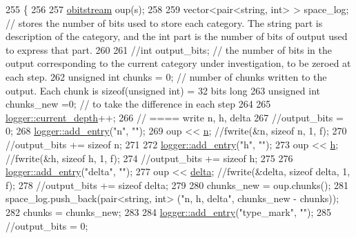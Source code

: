\begin{DoxyCode}
255                                                   \{
256   
257   \hyperlink{classobitstream}{obitstream} oup(s);
258 
259   vector<pair<string, int> > space\_log; \textcolor{comment}{// stores the number of bits used to store each category. The
       string part is description of the category, and the int part is the number of bits of output used to express that
       part.}
260 
261   \textcolor{comment}{//int output\_bits; // the number of bits in the output corresponding to the current category under
       investigation, to be zeroed at each step.}
262   \textcolor{keywordtype}{unsigned} \textcolor{keywordtype}{int} chunks = 0; \textcolor{comment}{// number of chunks written to the output. Each chunk is sizeof(unsigned int) =
       32 bits long}
263   \textcolor{keywordtype}{unsigned} \textcolor{keywordtype}{int} chunks\_new =0; \textcolor{comment}{// to take the difference in each step}
264 
265   \hyperlink{classlogger_a9d29b49bd318a719a8e85b59eac54fe0}{logger::current\_depth}++;
266   \textcolor{comment}{// ==== write n, h, delta}
267   \textcolor{comment}{//output\_bits = 0;}
268   \hyperlink{classlogger_a710163deb17bc81f70d53d285b8ac9ac}{logger::add\_entry}(\textcolor{stringliteral}{"n"}, \textcolor{stringliteral}{""});
269   oup << \hyperlink{classmarked__graph__compressed_a8d841016ddb11cfd33748c8deb6277ba}{n}; \textcolor{comment}{//fwrite(&n, sizeof n, 1, f);}
270   \textcolor{comment}{//output\_bits += sizeof n;}
271 
272   \hyperlink{classlogger_a710163deb17bc81f70d53d285b8ac9ac}{logger::add\_entry}(\textcolor{stringliteral}{"h"}, \textcolor{stringliteral}{""});
273   oup << \hyperlink{classmarked__graph__compressed_af6ff623407b673d08d0cab77b39c2193}{h}; \textcolor{comment}{//fwrite(&h, sizeof h, 1, f);}
274   \textcolor{comment}{//output\_bits += sizeof h;}
275 
276   \hyperlink{classlogger_a710163deb17bc81f70d53d285b8ac9ac}{logger::add\_entry}(\textcolor{stringliteral}{"delta"}, \textcolor{stringliteral}{""});
277   oup << \hyperlink{classmarked__graph__compressed_a8b2aaac68e9332ddc78d88eb60b323a7}{delta}; \textcolor{comment}{//fwrite(&delta, sizeof delta, 1, f);}
278   \textcolor{comment}{//output\_bits += sizeof delta;}
279 
280   chunks\_new = oup.chunks();
281   space\_log.push\_back(pair<string, int> (\textcolor{stringliteral}{"n, h, delta"}, chunks\_new - chunks));
282   chunks = chunks\_new;
283 
284   \hyperlink{classlogger_a710163deb17bc81f70d53d285b8ac9ac}{logger::add\_entry}(\textcolor{stringliteral}{"type\_mark"}, \textcolor{stringliteral}{""});
285   \textcolor{comment}{//output\_bits = 0;}

\end{DoxyCode}

